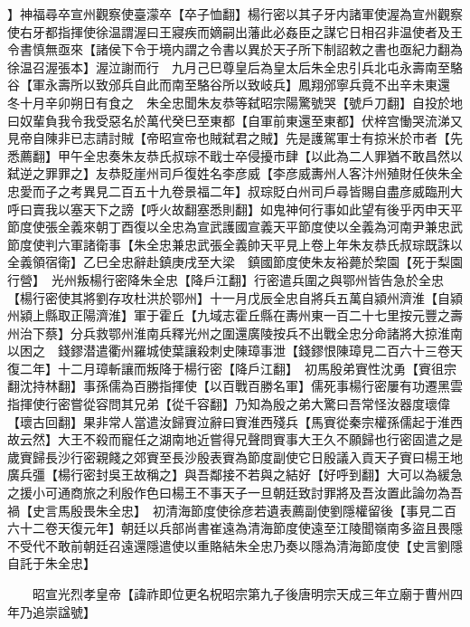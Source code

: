 】神福尋卒宣州觀察使臺濛卒【卒子恤翻】楊行密以其子牙内諸軍使渥為宣州觀察使右牙都指揮使徐温謂渥曰王寢疾而嫡嗣出藩此必姦臣之謀它日相召非温使者及王令書慎無亟來【諸侯下令于境内謂之令書以異於天子所下制詔敕之書也亟紀力翻為徐温召渥張本】渥泣謝而行　九月己巳尊皇后為皇太后朱全忠引兵北屯永壽南至駱谷【軍永壽所以致邠兵自此而南至駱谷所以致岐兵】鳳翔邠寧兵竟不出辛未東還　冬十月辛卯朔日有食之　朱全忠聞朱友恭等弑昭宗陽驚號哭【號戶刀翻】自投於地曰奴輩負我令我受惡名於萬代癸巳至東都【自軍前東還至東都】伏梓宫慟哭流涕又見帝自陳非已志請討賊【帝昭宣帝也賊弑君之賊】先是護駕軍士有掠米於市者【先悉薦翻】甲午全忠奏朱友恭氏叔琮不戢士卒侵擾市肆【以此為二人罪猶不敢昌然以弑逆之罪罪之】友恭貶崖州司戶復姓名李彦威【李彦威夀州人客汴州殖財任俠朱全忠愛而子之考異見二百五十九卷景福二年】叔琮貶白州司戶尋皆賜自盡彦威臨刑大呼曰賣我以塞天下之謗【呼火故翻塞悉則翻】如鬼神何行事如此望有後乎丙申天平節度使張全義來朝丁酉復以全忠為宣武護國宣義天平節度使以全義為河南尹兼忠武節度使判六軍諸衛事【朱全忠兼忠武張全義帥天平見上卷上年朱友恭氏叔琮既誅以全義領宿衛】乙巳全忠辭赴鎮庚戌至大梁　鎮國節度使朱友裕薨於棃園【死于梨園行營】　光州叛楊行密降朱全忠【降戶江翻】行密遣兵圍之與鄂州皆告急於全忠【楊行密使其將劉存攻杜洪於鄂州】十一月戊辰全忠自將兵五萬自潁州濟淮【自潁州潁上縣取正陽濟淮】軍于霍丘【九域志霍丘縣在夀州東一百二十七里按元豐之壽州治下蔡】分兵救鄂州淮南兵釋光州之圍還廣陵按兵不出戰全忠分命諸將大掠淮南以困之　錢鏐潜遣衢州羅城使葉讓殺刺史陳璋事泄【錢鏐恨陳璋見二百六十三卷天復二年】十二月璋斬讓而叛降于楊行密【降戶江翻】　初馬殷弟賨性沈勇【賨徂宗翻沈持林翻】事孫儒為百勝指揮使【以百戰百勝名軍】儒死事楊行密屢有功遷黑雲指揮使行密嘗從容問其兄弟【從千容翻】乃知為殷之弟大驚曰吾常怪汝器度瓌偉【瓌古回翻】果非常人當遣汝歸賨泣辭曰賨淮西殘兵【馬賨從秦宗權孫儒起于淮西故云然】大王不殺而寵任之湖南地近嘗得兄聲問賨事大王久不願歸也行密固遣之是歲賨歸長沙行密親餞之郊賨至長沙殷表賨為節度副使它日殷議入貢天子賨曰楊王地廣兵彊【楊行密封吳王故稱之】與吾鄰接不若與之結好【好呼到翻】大可以為緩急之援小可通商旅之利殷作色曰楊王不事天子一旦朝廷致討罪將及吾汝置此論勿為吾禍【史言馬殷畏朱全忠】　初清海節度使徐彦若遺表薦副使劉隱權留後【事見二百六十二卷天復元年】朝廷以兵部尚書崔遠為清海節度使遠至江陵聞嶺南多盜且畏隱不受代不敢前朝廷召遠還隱遣使以重賂結朱全忠乃奏以隱為清海節度使【史言劉隱自託于朱全忠】

　　昭宣光烈孝皇帝【諱祚即位更名柷昭宗第九子後唐明宗天成三年立廟于曹州四年乃追崇諡號】

